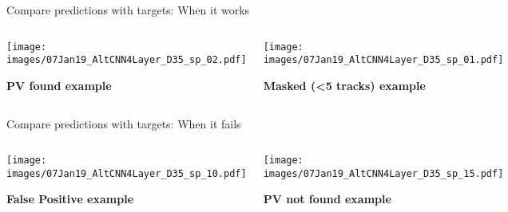 \begin{frame}{Compare predictions with targets: When it works}
  \begin{columns}[c]
        \begin{center}
           \texttt{[image: images/07Jan19\_AltCNN4Layer\_D35\_sp\_02.pdf]}

           \textbf{\color{lhcbBlue}\large PV found example}
       \end{center}
       \begin{center}
           \texttt{[image: images/07Jan19\_AltCNN4Layer\_D35\_sp\_01.pdf]}

           \textbf{\color{lhcbBlue}\large Masked (<5 tracks) example}
       \end{center}
  \end{columns}
\end{frame}


\begin{frame}{Compare predictions with targets: When it fails}
  \begin{columns}[c]
        \begin{center}
           \texttt{[image: images/07Jan19\_AltCNN4Layer\_D35\_sp\_10.pdf]}

           \textbf{\color{lhcbRed}\large False Positive example}
        \end{center}
        \begin{center}
           \texttt{[image: images/07Jan19\_AltCNN4Layer\_D35\_sp\_15.pdf]}

           \textbf{\color{lhcbRed}\large PV not found example}
       \end{center}
  \end{columns}
\end{frame}
